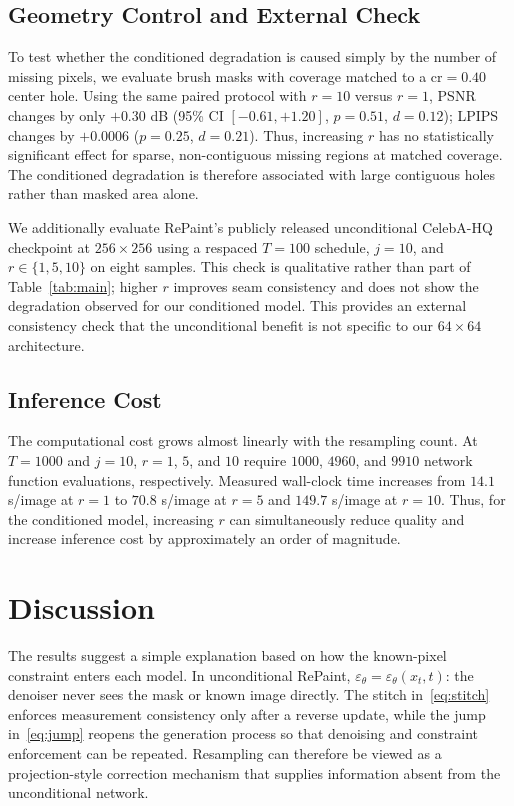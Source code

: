 \documentclass{article}
\begin{document}
\subsection{Geometry Control and External Check}

To test whether the conditioned degradation is caused simply by the number of
missing pixels, we evaluate brush masks with coverage matched to a
$\mathrm{cr}{=}0.40$ center hole.
Using the same paired protocol with $r{=}10$ versus $r{=}1$,
PSNR changes by only $+0.30$ dB
(95\% CI $[-0.61,+1.20]$, $p{=}0.51$, $d{=}0.12$);
LPIPS changes by $+0.0006$ ($p{=}0.25$, $d{=}0.21$).
Thus, increasing $r$ has no statistically significant effect for sparse,
non-contiguous missing regions at matched coverage.
The conditioned degradation is therefore associated with large contiguous
holes rather than masked area alone.

We additionally evaluate RePaint's publicly released unconditional CelebA-HQ
checkpoint at $256{\times}256$ using a respaced $T{=}100$ schedule,
$j{=}10$, and $r\in\{1,5,10\}$ on eight samples.
This check is qualitative rather than part of Table~\ref{tab:main};
higher $r$ improves seam consistency and does not show the degradation observed
for our conditioned model.
This provides an external consistency check that the unconditional benefit is
not specific to our $64{\times}64$ architecture.

\subsection{Inference Cost}

The computational cost grows almost linearly with the resampling count.
At $T{=}1000$ and $j{=}10$, $r{=}1$, $5$, and $10$ require
$1000$, $4960$, and $9910$ network function evaluations, respectively.
Measured wall-clock time increases from $14.1$ s/image at $r{=}1$ to
$70.8$ s/image at $r{=}5$ and $149.7$ s/image at $r{=}10$.
Thus, for the conditioned model, increasing $r$ can simultaneously reduce
quality and increase inference cost by approximately an order of magnitude.


\section{Discussion}
\label{sec:discussion}

The results suggest a simple explanation based on how the known-pixel
constraint enters each model.
In unconditional RePaint,
$\varepsilon_\theta=\varepsilon_\theta(x_t,t)$: the denoiser never sees the
mask or known image directly.
The stitch in~\eqref{eq:stitch} enforces measurement consistency only after a
reverse update, while the jump in~\eqref{eq:jump} reopens the generation process
so that denoising and constraint enforcement can be repeated.
Resampling can therefore be viewed as a projection-style correction mechanism
that supplies information absent from the unconditional network.
\end{document}
